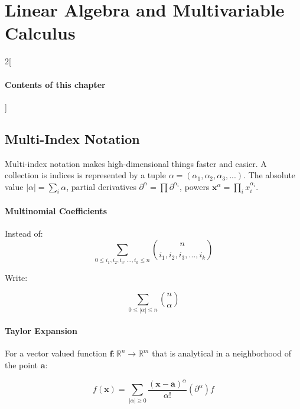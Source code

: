 \chapter{Linear Algebra and Multivariable Calculus}

\begin{multicols}{2}[\subsubsection*{Contents of this chapter}]
\end{multicols}



\section{Multi-Index Notation}
Multi-index notation makes high-dimensional things faster and easier. A collection is indices is represented by a tuple $\alpha = \left(\alpha_1,\alpha_2,\alpha_3,... \right)$. The absolute value $|\alpha| = \sum_i \alpha$, partial derivatives $\partial^\alpha = \prod \partial^{\alpha_i}$, powers $\mathbf{x}^\alpha = \prod_i x_i^{\alpha_i}$.

\subsubsection{Multinomial Coefficients}	

Instead of:
\begin{equation}
\sum_{0\leq i_1,i_2,i_3,...,i_k \leq n} {n \choose i_1,i_2,i_3,...,i_k} 
\end{equation}

Write:

\begin{equation}	
\sum_{0\leq |\alpha|\leq n}{n \choose \alpha}
\end{equation}

\subsubsection{Taylor Expansion}

For a vector valued function $\mathbf{f}: \mathbb{R}^n \rightarrow \mathbb{R}^m$ that is analytical in a neighborhood of the point $\mathbf{a}$:

\begin{equation}
f(\mathbf{x}) = \sum_{|\alpha|\geq0} \frac{(\mathbf{x} - \mathbf{a})^\alpha}{\alpha!}(\partial^\alpha)f
\end{equation}



